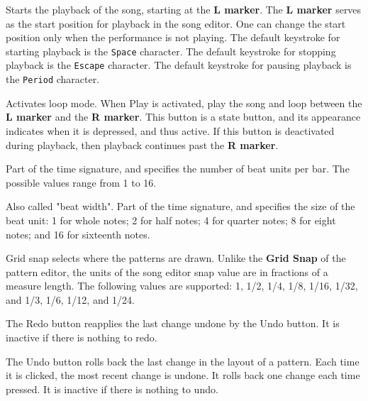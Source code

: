    Starts the playback of the song, starting at the \textbf{L marker}.
   The \textbf{L marker} serves as the start position for playback
   in the song editor.  One can change the start position only when the
   performance is not playing.
   The default keystroke for starting playback is the \texttt{Space} character.
   The default keystroke for stopping playback is the \texttt{Escape} character.
   The default keystroke for pausing playback is the \texttt{Period} character.

   Activates loop mode. When Play is activated,  play the song and loop
   between the
   \textbf{L marker} and the \textbf{R marker}.
   This button is a state button, and its appearance indicates when it is
   depressed, and thus active.
   If this button is deactivated during playback, then playback
   continues past the \textbf{R marker}.

   Part of the time signature, and specifies the number of beat units per bar.
   The possible values range from 1 to 16.

   Also called "beat width".
   Part of the time signature, and specifies the size of the beat unit:
   1 for whole notes; 2 for half notes; 4 for quarter notes; 8 for eight notes;
   and 16 for sixteenth notes.

   Grid snap selects where the patterns are drawn.
   Unlike the \textbf{Grid Snap} of the pattern editor, the units
   of the song editor snap value are in fractions of a measure length.
   The following values are supported:
   1, 1/2, 1/4, 1/8, 1/16, 1/32, and 1/3, 1/6, 1/12, and 1/24.

   The Redo button reapplies the last change undone by
   the Undo button.  It is inactive if there is nothing to redo.

   The Undo button rolls back the last change in the layout of a
   pattern.  Each time it is clicked, the most recent change is undone.
   It rolls back one change each time pressed.
   It is inactive if there is nothing to undo.

